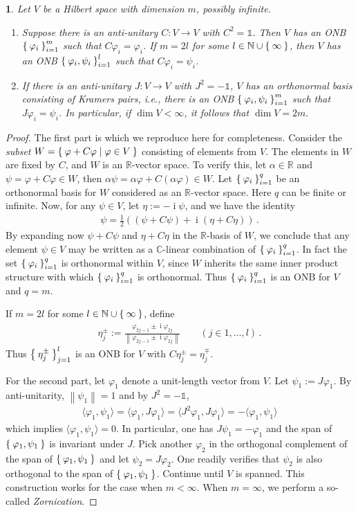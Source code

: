 \documentclass[a4paper,10pt]{article}
\numberwithin{equation}{section}
\theoremstyle{plain}
\theoremstyle{plain}
\newtheorem{lem}[thm]{\protect\lemmaname}
\theoremstyle{plain}
\theoremstyle{plain}
\theoremstyle{plain}
\theoremstyle{remark}
\theoremstyle{definition}
\theoremstyle{plain}
\providecommand{\lemmaname}{Lemma}
\newcommand{\ii}{\operatorname{i}}
\newcommand{\NN}{\mathbb{N}}
\newcommand{\RR}{\mathbb{R}}
\newcommand{\CC}{\mathbb{C}}
\newcommand\norm[1]{\left\lVert#1\right\rVert}
\newcommand{\ip}[2]{\langle #1, #2 \rangle}
\newcommand{\vf}{\varphi}
\newcommand{\Id}{\mathds{1}}
\newcommand{\eq}[1]{\begin{align*}#1\end{align*}}
\begin{document}
	\begin{lem}\label{lem:basis in RCH symmetry}
		Let $V$ be a Hilbert space with dimension $m$, possibly infinite.
		\begin{enumerate}
			\item Suppose there is an anti-unitary $C:V\to V$ with $C^2=\Id$. Then $V$ has an ONB $\Set{\vf_i}_{i=1}^m$ such that $C\vf_i=\vf_i$. If $m=2l$ for some $l\in\NN\cup\Set{\infty}$, then $V$ has an ONB $\Set{\vf_i,\psi_i}_{i=1}^l$ such that $C\vf_i=\psi_i$.
			\item If there is an anti-unitary $J:V\to V$ with $J^2=-\Id$, $V$ has an orthonormal basis consisting of \emph{Kramers pairs}, i.e., there is an ONB $\Set{\vf_i,\psi_i}_{i=1}^m$ such that $J\vf_i=\psi_{i}$. In particular, if $\dim V<\infty$, it follows that $\dim V=2m.$
		\end{enumerate}
	\end{lem}
	\begin{proof}
		The first part is \cite[Lemma 1]{garcia2006complex} which we reproduce here for completeness. Consider the \emph{subset} $W=\Set{\varphi+C\varphi| \varphi\in V}$ consisting of elements from $V$. The elements in $W$ are fixed by $C$, and $W$ is an $\RR$-vector space. To verify this, let $\alpha\in\RR$ and $\psi=\varphi+C\varphi\in W$, then $\alpha\psi=\alpha\varphi+C(\alpha\varphi)\in W$. Let $\Set{\varphi_i}_{i=1}^{q}$ be an orthonormal basis for $W$ considered as an $\RR$-vector space. Here $q$ can be finite or infinite. Now, for any $\psi\in V$, let $\eta :=-\ii\psi$, and we have the identity 
		\eq{
			\psi=\frac{1}{2}((\psi+C\psi)+\ii(\eta + C\eta))\,.
		} 
		By expanding now $\psi+C \psi$ and $\eta+C\eta$ in the $\RR$-basis of $W$, we conclude that any element $\psi\in V$ may be written as a $\CC$-linear combination of $\Set{\varphi_i}_{i=1}^q$. In fact the set $\Set{\varphi_i}_{i=1}^q$ is orthonormal within $V$, since $W$ inherits the same inner product structure with which $\Set{\varphi_i}_{i=1}^q$ is orthonormal. Thus $\Set{\varphi_i}_{i=1}^q$ is an ONB for $V$ and $q=m$.
		
		If $m=2l$ for some $l\in\NN\cup\Set{\infty}$, define \eq{\eta_{j}^\pm:=\frac{\vf_{2j-1}\pm\ii \vf_{2j}}{\norm{\vf_{2j-1}\pm\ii \vf_{2j}}}\qquad(j\in{1,\dots,l})\,.} 
		Thus $\Set{\eta^\pm_j}_{j=1}^l$ is an ONB for $V$ with $C\eta_j^\pm=\eta_j^\mp$.
		
		For the second part, let $\varphi_1$ denote a unit-length vector from $V$. Let $\psi_1:=J\varphi_1$. By anti-unitarity, $\norm{\psi_{1}}=1$ and by $J^2=-\Id$,\eq{\ip{\varphi_1}{\psi_1}=\ip{\varphi_1}{J\vf_1}=\ip{J^2\vf_1}{J\vf_1}=-\ip{\vf_1}{\psi_1}} which implies $\ip{\varphi_1}{\psi_1}=0$. In particular, one has $J\psi_1=-\vf_1$ and the span of $\Set{\vf_1,\psi_1}$ is invariant under $J$. Pick another $\varphi_2$ in the orthogonal complement of the span of $\Set{\vf_1,\psi_1}$ and let $\psi_2=J\vf_2$. One readily verifies that $\psi_2$ is also orthogonal to the span of $\Set{\vf_1,\psi_1}$. Continue until $V$ is spanned. This construction works for the case when $m<\infty$. When $m=\infty$, we perform a so-called \emph{Zornication}.
	\end{proof}
	
\end{document}

